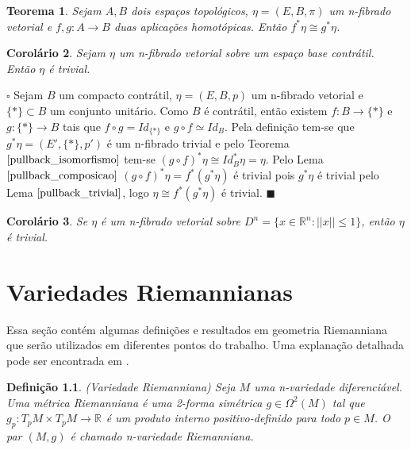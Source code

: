\documentclass[12pt]{book}
\newtheorem{teorema}{Teorema}[section]
\newtheorem{corolario}[teorema]{Corolário}
\newtheorem{definicao}[teorema]{Definição}
\newenvironment{prova}[1]{$\square$ #1}{\hfill$\blacksquare$}
\newcommand{\norma}[1]{||#1||}
\newcommand{\real}[1]{\mathbb{R}^{#1}}
\begin{document}
	\begin{teorema}\label{pullback_isomorfismo}
		Sejam $A, B$ dois espaços topológicos, $\eta=(E, B, \pi)$ um n-fibrado vetorial e $f,g: A\to B$ duas aplicações homotópicas. Então $f^{*}\eta \cong g^{*}\eta$.
	\end{teorema}
	
	\begin{corolario}\label{pullback_contratil}
		Sejam $\eta$ um n-fibrado vetorial sobre um espaço base contrátil. Então $\eta$ é trivial.
	\end{corolario}
	\begin{prova}
		Sejam $B$ um compacto contrátil, $\eta=(E, B, p)$ um n-fibrado vetorial e $\{*\} \subset B$ um conjunto unitário. Como $B$ é contrátil, então existem $f:B\to \{*\}$ e $g:\{*\}\to B$ tais que $f\circ g = Id_{\{*\}}$ e $g\circ f \simeq Id_{B}$. Pela definição tem-se que $g^{*}\eta = (E', \{*\}, p')$ é um n-fibrado trivial e pelo Teorema $\ref{pullback_isomorfismo}$ tem-se $(g\circ f)^{*}\eta \cong Id_{B}^{*}\eta = \eta$. Pelo Lema $\ref{pullback_composicao}$ $(g\circ f)^{*}\eta = f^{*}(g^{*}\eta) $ é trivial pois $g^{*}\eta$ é trivial pelo Lema $\ref{pullback_trivial}$, logo $ \eta \cong f^{*}(g^{*}\eta)$ é trivial.
	\end{prova}
	
	\begin{corolario}
		Se $\eta$ é um n-fibrado vetorial sobre $D^{n} = \{ x\in \real{n}:\norma{x}\leq 1\}$, então $\eta$ é trivial.
	\end{corolario}

	\chapter{Variedades Riemannianas}\label{apendice_variedade_riemanniana}
	
	Essa seção contém algumas definições e resultados em geometria Riemanniana que serão utilizados em diferentes pontos do trabalho. Uma explanação detalhada pode ser encontrada em \cite{manfredo_riemannian_geo}.
	
	\begin{definicao}\label{definicao_variedade_riemanniana}
		(Variedade Riemanniana) Seja $M$ uma n-variedade diferenciável. Uma métrica Riemanniana é uma 2-forma simétrica $g \in \Omega^{2}(M)$ tal que $g_{p}:T_{p}M \times T_{p}M \to \real{}$ é um produto interno positivo-definido para todo $p \in M$. O par $(M, g)$ é chamado n-variedade Riemanniana.
	\end{definicao}
	
\end{document}
